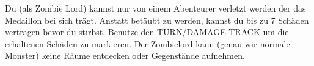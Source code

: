 
  \begin{itemize}
    \bitem Du (als Zombie Lord) kannst nur von einem Abenteurer verletzt werden der das Medaillon bei sich trägt. Anstatt betäubt zu werden, kannst du bis zu 7 Schäden vertragen bevor du stirbst. Benutze den TURN/DAMAGE TRACK um die erhaltenen Schäden zu markieren.
    \bitem Der Zombielord kann (genau wie normale Monster) keine Räume entdecken oder Gegenstände aufnehmen.
  \end{itemize}

